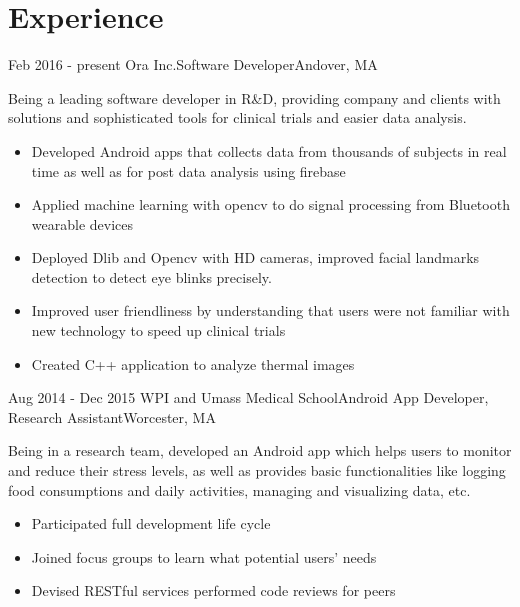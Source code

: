 \documentclass[10pt,a4paper,merriweather]{moderncv}        %
\begin{document}
\makecvtitle
\vspace{-1.5cm}

\section{Experience}

\cventry
{Feb 2016 - present}
{Ora Inc.}{Software Developer}{Andover, MA}{}
{Being a leading software developer in R\&D, providing company and clients with solutions and sophisticated tools for clinical trials and easier data analysis.
\begin{itemize}
\item Developed Android apps that collects data from thousands of subjects in real time as well as for post data analysis using firebase
\item Applied machine learning with opencv to do signal processing from Bluetooth wearable devices
\item Deployed Dlib and Opencv with HD cameras, improved facial landmarks detection to detect eye blinks precisely.
\item Improved user friendliness by understanding that users were not familiar with new technology to speed up clinical trials
\item Created C++ application  to analyze thermal images 
\end{itemize}}
\vspace{.15cm}

\cventry
{Aug 2014 - Dec 2015}
{WPI and Umass Medical School}{Android App Developer, Research Assistant}{Worcester, MA}{}
{Being in a research team, developed an Android app which helps users to monitor and reduce their stress levels, as well as provides basic functionalities like logging food consumptions and daily activities, managing and visualizing data, etc. 
\begin{itemize}
\item Participated full development life cycle 
\item Joined focus groups to learn what potential users' needs
\item Devised RESTful services performed code reviews for peers
\end{itemize}}
\vspace{.15cm}
\end{document}
